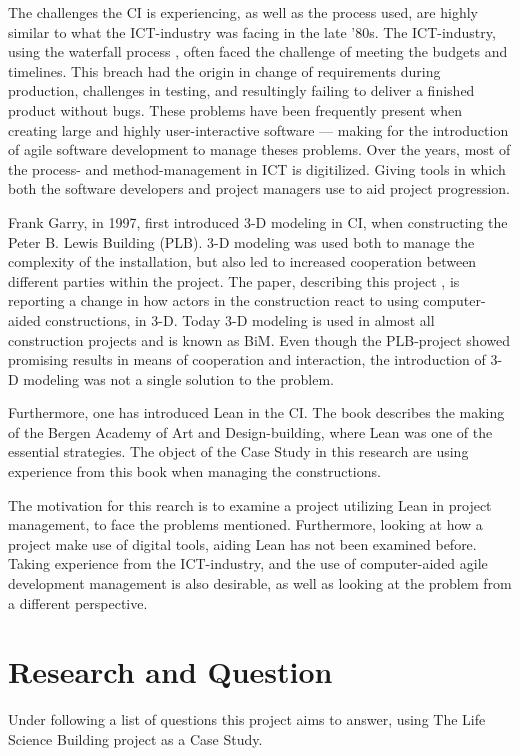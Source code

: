 The challenges the CI is experiencing, as well as the process used, are highly similar to what the ICT-industry was facing in the late '80s. The ICT-industry, using the waterfall process \cite{royce}, often faced the challenge of meeting the budgets and timelines. This breach had the origin in change of requirements during production, challenges in testing, and resultingly failing to deliver a finished product without bugs. These problems have been frequently present when creating large and highly user-interactive software — making for the introduction of agile software development to manage theses problems. Over the years, most of the process- and method-management in ICT is digitilized. Giving tools in which both the software developers and project managers use to aid project progression.  

Frank Garry, in 1997, first introduced 3-D modeling in CI, when constructing the Peter B. Lewis Building (PLB). 3-D modeling was used both to manage the complexity of the installation, but also led to increased cooperation between different parties within the project. The paper, describing this project \cite{frank_gehry}, is reporting a change in how actors in the construction react to using computer-aided constructions, in 3-D. Today 3-D modeling is used in almost all construction projects and is known as BiM. Even though the PLB-project showed promising results in means of cooperation and interaction, the introduction of 3-D modeling was not a single solution to the problem.

Furthermore, one has introduced Lean in the CI. The book \cite{lean_i_praksis} describes the making of the Bergen Academy of Art and Design-building, where Lean was one of the essential strategies. The object of the Case Study in this research are using experience from this book when managing the constructions. 

The motivation for this rearch is to examine a project utilizing Lean in project management, to face the problems mentioned. Furthermore, looking at how a project make use of digital tools, aiding Lean has not been examined before. Taking experience from the ICT-industry, and the use of computer-aided agile development management is also desirable, as well as looking at the problem from a different perspective.

\section{Research and Question} \label{sec:research}
Under following a list of questions this project aims to answer, using The Life Science Building project as a Case Study.

